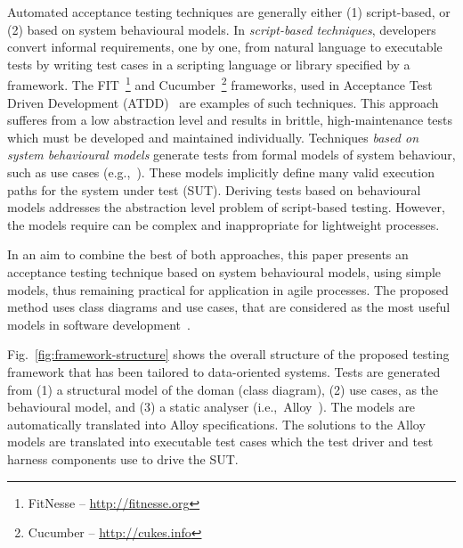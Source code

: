 Automated acceptance testing techniques are generally either (1) script-based, or (2) based on system behavioural models. 
In \textit{script-based techniques}, developers convert informal requirements, one by one, from natural language to executable tests by writing test cases in a scripting language or library specified by a framework. The FIT~\footnote{FitNesse – \url{http://fitnesse.org}} and Cucumber~\footnote{Cucumber – \url{http://cukes.info}} frameworks, used in Acceptance Test Driven Development (ATDD)~\cite{Pugh2011} are examples of such techniques. This approach sufferes from a low abstraction level and results in brittle, high-maintenance tests which must be developed and maintained individually. 
Techniques \textit{based on system behavioural models} generate tests from formal models of system behaviour, such as use cases (e.g.,~\cite{Nebut2006,Sarma2007,Kaplan2008}). These models implicitly define many valid execution paths for the system under test (SUT). %
Deriving tests based on behavioural models addresses the abstraction level problem of script-based testing. However, the models require can be complex and inappropriate for lightweight processes. 

In an aim to combine the best of both approaches, this paper presents an acceptance testing technique based on system behavioural models, using simple models, thus remaining practical for application in agile processes. The proposed method uses class diagrams and use cases, that are considered as the most useful models in software development~\cite{Erickson2007,Erickson2008}. 


Fig.~\ref{fig:framework-structure} shows the overall structure of the proposed testing framework  that has been tailored to data-oriented systems. Tests are generated from (1) a structural model of the doman (class diagram), (2) use cases, as the behavioural model, and (3) a static analyser (i.e.,\ Alloy~\cite{Jackson2002}). The models are automatically translated into Alloy specifications. The solutions to the Alloy models are translated into executable test cases which the test driver and test harness components use to drive the SUT.

